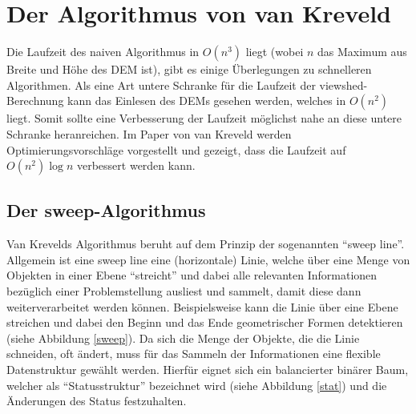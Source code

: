 \section{Der Algorithmus von van Kreveld}

Die Laufzeit des naiven Algorithmus in $O(n^3)$ liegt (wobei $n$ das Maximum aus Breite und Höhe des DEM ist), gibt es einige Überlegungen zu 
schnelleren Algorithmen. Als eine Art untere Schranke für die Laufzeit der viewshed-Berechnung kann das Einlesen des DEMs gesehen werden, welches 
in $O(n^2)$ liegt. Somit sollte eine Verbesserung der Laufzeit möglichst nahe an diese untere Schranke heranreichen. Im Paper von van Kreveld 
\cite{vanKrev} werden Optimierungsvorschläge vorgestellt und gezeigt, dass die Laufzeit auf $O(n^2)\log n$ verbessert werden kann. 

\subsection{Der sweep-Algorithmus}
Van Krevelds Algorithmus beruht auf dem Prinzip der sogenannten ``sweep line''. Allgemein ist eine sweep line eine (horizontale) Linie, 
welche über eine Menge von Objekten in einer Ebene ``streicht'' und dabei alle relevanten Informationen bezüglich einer Problemstellung ausliest und 
sammelt, damit diese dann weiterverarbeitet werden können. Beispielsweise kann die Linie über eine Ebene streichen und dabei den Beginn und das Ende 
geometrischer Formen detektieren (siehe Abbildung \ref{sweep}). Da sich die Menge der Objekte, die die Linie schneiden, oft ändert, muss für das 
Sammeln der Informationen eine flexible Datenstruktur gewählt werden. Hierfür eignet sich ein balancierter binärer Baum, welcher als ``Statusstruktur''
bezeichnet wird (siehe Abbildung \ref{stat}) und die Änderungen des Status festzuhalten. 

